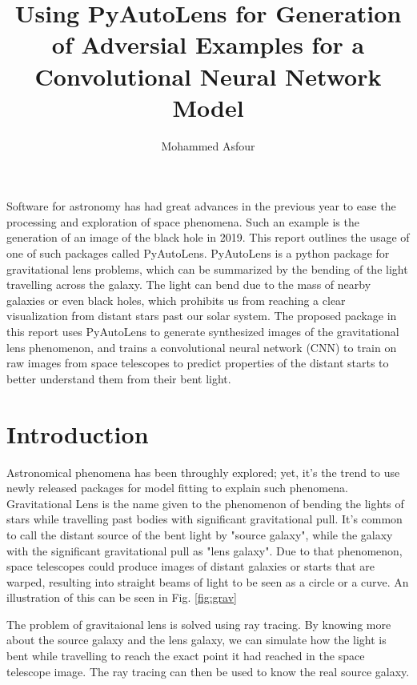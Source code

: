 \documentclass[12pt]{article}
\title{Using PyAutoLens for Generation of Adversial Examples for a Convolutional Neural Network Model}
\author{Mohammed Asfour}
\begin{document}
\maketitle

\abstract%
Software for astronomy has had great advances in the previous year to ease the processing and exploration of space phenomena. Such an example is the generation of an image of the black hole in 2019. This report outlines the usage of one of such packages called PyAutoLens. PyAutoLens is a python package for gravitational lens problems, which can be summarized by the bending of the light travelling across the galaxy. The light can bend due to the mass of nearby galaxies or even black holes, which prohibits us from reaching a clear visualization from distant stars past our solar system. The proposed package in this report uses PyAutoLens to generate synthesized images of the gravitational lens phenomenon, and trains a convolutional neural network (CNN) to train on raw images from space telescopes to predict properties of the distant starts to better understand them from their bent light.

\section{Introduction}
Astronomical phenomena has been throughly explored\cite{astro5}\cite{astro3}\cite{astro4}; yet, it's the trend to use newly released packages for model fitting to explain such phenomena\cite{astro1}\cite{astro2}.
Gravitational Lens is the name given to the phenomenon of bending the lights of stars while travelling past bodies with significant gravitational pull. It's common to call the distant source of the bent light by "source galaxy", while the galaxy with the significant gravitational pull as "lens galaxy". Due to that phenomenon, space telescopes could produce images of distant galaxies or starts that are warped, resulting into straight beams of light to be seen as a circle or a curve. An illustration of this can be seen in Fig. \ref{fig:grav}

The problem of gravitaional lens is solved using ray tracing. By knowing more about the source galaxy and the lens galaxy, we can simulate how the light is bent while travelling to reach the exact point it had reached in the space telescope image. The ray tracing can then be used to know the real source galaxy.
\end{document}
